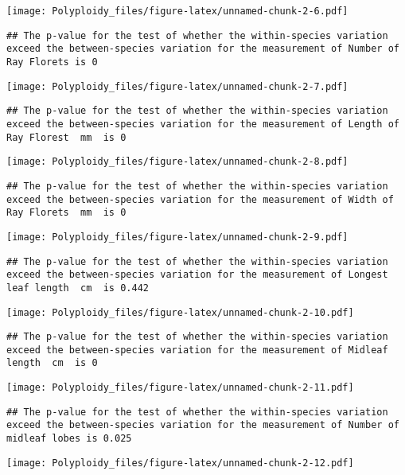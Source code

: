 \documentclass[
]{article}
\begin{document}
\texttt{[image: Polyploidy\_files/figure-latex/unnamed-chunk-2-6.pdf]}

\begin{verbatim}
## The p-value for the test of whether the within-species variation exceed the between-species variation for the measurement of Number of Ray Florets is 0
\end{verbatim}

\texttt{[image: Polyploidy\_files/figure-latex/unnamed-chunk-2-7.pdf]}

\begin{verbatim}
## The p-value for the test of whether the within-species variation exceed the between-species variation for the measurement of Length of Ray Florest  mm  is 0
\end{verbatim}

\texttt{[image: Polyploidy\_files/figure-latex/unnamed-chunk-2-8.pdf]}

\begin{verbatim}
## The p-value for the test of whether the within-species variation exceed the between-species variation for the measurement of Width of Ray Florets  mm  is 0
\end{verbatim}

\texttt{[image: Polyploidy\_files/figure-latex/unnamed-chunk-2-9.pdf]}

\begin{verbatim}
## The p-value for the test of whether the within-species variation exceed the between-species variation for the measurement of Longest leaf length  cm  is 0.442
\end{verbatim}

\texttt{[image: Polyploidy\_files/figure-latex/unnamed-chunk-2-10.pdf]}

\begin{verbatim}
## The p-value for the test of whether the within-species variation exceed the between-species variation for the measurement of Midleaf length  cm  is 0
\end{verbatim}

\texttt{[image: Polyploidy\_files/figure-latex/unnamed-chunk-2-11.pdf]}

\begin{verbatim}
## The p-value for the test of whether the within-species variation exceed the between-species variation for the measurement of Number of midleaf lobes is 0.025
\end{verbatim}

\texttt{[image: Polyploidy\_files/figure-latex/unnamed-chunk-2-12.pdf]}
\end{document}

